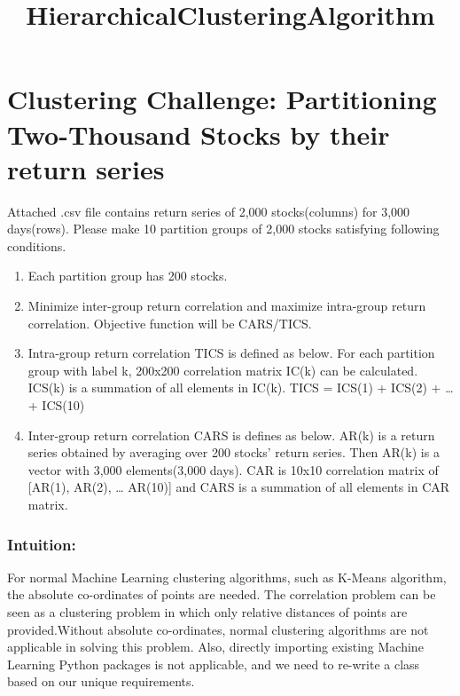 \documentclass[11pt]{article}
\title{HierarchicalClusteringAlgorithm}
\begin{document}
    
    
    \maketitle
    
    

    
    \section{Clustering Challenge: Partitioning Two-Thousand Stocks by their
return
series}\label{clustering-challenge-partitioning-two-thousand-stocks-by-their-return-series}

Attached .csv file contains return series of 2,000 stocks(columns) for
3,000 days(rows). Please make 10 partition groups of 2,000 stocks
satisfying following conditions.

\begin{enumerate}
\def\labelenumi{\arabic{enumi}.}
\item
  Each partition group has 200 stocks.
\item
  Minimize inter-group return correlation and maximize intra-group
  return correlation. Objective function will be CARS/TICS.
\item
  Intra-group return correlation TICS is defined as below. For each
  partition group with label k, 200x200 correlation matrix IC(k) can be
  calculated. ICS(k) is a summation of all elements in IC(k). TICS =
  ICS(1) + ICS(2) + \ldots{} + ICS(10)
\item
  Inter-group return correlation CARS is defines as below. AR(k) is a
  return series obtained by averaging over 200 stocks' return series.
  Then AR(k) is a vector with 3,000 elements(3,000 days). CAR is 10x10
  correlation matrix of {[}AR(1), AR(2), \ldots{} AR(10){]} and CARS is
  a summation of all elements in CAR matrix.
\end{enumerate}

    \subsubsection{Intuition:}\label{intuition}

For normal Machine Learning clustering algorithms, such as K-Means
algorithm, the absolute co-ordinates of points are needed. The
correlation problem can be seen as a clustering problem in which only
relative distances of points are provided.Without absolute co-ordinates,
normal clustering algorithms are not applicable in solving this problem.
Also, directly importing existing Machine Learning Python packages is
not applicable, and we need to re-write a class based on our unique
requirements.
\end{document}
